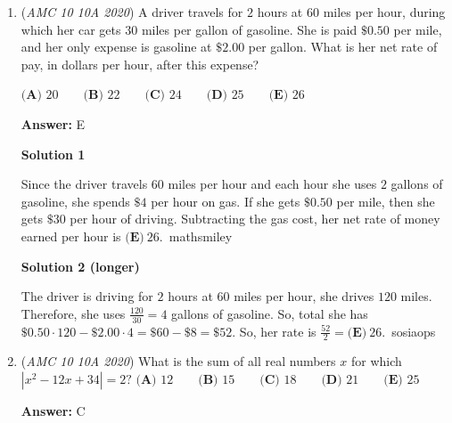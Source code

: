\begin{enumerate}
\textbf{Solution 3}

We can simply set $x = a - 3, y = b - 4,$ and $z = 5 - c$. Now, the problem simplifies to 
 \[\frac{x}{z}\cdot\frac{-y}{x}\cdot\frac{z}{y}=\frac{-xyz}{xyz}=\boxed{\textbf{(A) } {-}1}.\]

 Explanation: After substituting $x$, $y$, and $z$, the opposites (for example $5 - c$ and $c - 5$) can just be written as the negative of each. With the same example, this can be shown by: $c - 5 = -(5 - c)$.

 Education, The Study of Everything

 


	\item (\textit{AMC 10 10A 2020}) A driver travels for $2$ hours at $60$ miles per hour, during which her car gets $30$ miles per gallon of gasoline. She is paid $\$0.50$ per mile, and her only expense is gasoline at $\$2.00$ per gallon. What is her net rate of pay, in dollars per hour, after this expense?


 $\textbf{(A) }20 \qquad\textbf{(B) }22 \qquad\textbf{(C) }24 \qquad\textbf{(D) } 25\qquad\textbf{(E) } 26$

 \textbf{Answer: }E



\textbf{Solution 1}

Since the driver travels $60$ miles per hour and each hour she uses $2$ gallons of gasoline, she spends $\$4$ per hour on gas. If she gets $\$0.50$ per mile, then she gets $\$30$ per hour of driving. Subtracting the gas cost, her net rate of money earned per hour is $\boxed{\textbf{(E)}\ 26}$.~mathsmiley

 



\textbf{Solution 2 (longer)}

The driver is driving for $2$ hours at $60$ miles per hour, she drives $120$ miles. Therefore, she uses $\frac{120}{30}=4$ gallons of gasoline. So, total she has $\$0.50\cdot120-\$2.00\cdot4=\$60-\$8=\$52$. So, her rate is $\frac{52}{2}=\boxed{\textbf{(E)}\ 26}$.~sosiaops

 


	\item (\textit{AMC 10 10A 2020}) What is the sum of all real numbers $x$ for which $|x^2-12x+34|=2?$
$\textbf{(A) } 12 \qquad \textbf{(B) } 15 \qquad \textbf{(C) } 18 \qquad \textbf{(D) } 21 \qquad \textbf{(E) } 25$

 \textbf{Answer: }C




\end{enumerate}
